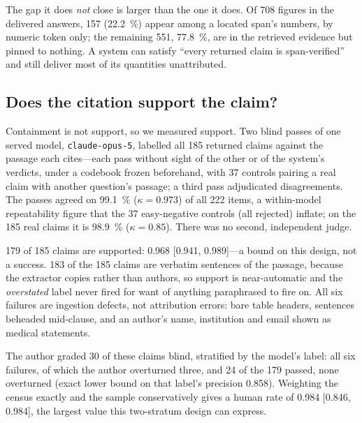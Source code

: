 \documentclass[conference,a4paper]{IEEEtran}
\begin{document}
The gap it does \emph{not} close is larger than the one it does. Of \num{708} figures in the
delivered answers, \num{157} (\SI{22.2}{\percent}) appear among a located span's numbers, by
numeric token only; the remaining \num{551}, \SI{77.8}{\percent}, are in the retrieved
evidence but pinned to nothing. A system can satisfy ``every returned claim is
span-verified'' and still deliver most of its quantities unattributed.

\subsection{Does the citation support the claim?}
Containment is not support, so we measured support. Two blind passes of one served model,
\texttt{claude-opus-5}, labelled all \num{185} returned claims against the passage each
cites---each pass without sight of the other or of the system's verdicts, under a codebook
frozen beforehand, with \num{37} controls pairing a real claim with another question's
passage; a third pass adjudicated disagreements. The passes agreed on \SI{99.1}{\percent}
($\kappa = \num{0.973}$) of all \num{222} items, a within-model repeatability figure that the
\num{37} easy-negative controls (all rejected) inflate; on the \num{185} real claims it is
\SI{98.9}{\percent} ($\kappa = \num{0.85}$). There was no second, independent judge.

\num{179} of \num{185} claims are supported: \num{0.968} [\num{0.941}, \num{0.989}]---a
bound on this design, not a success. \num{183} of the \num{185} claims are verbatim
sentences of the passage, because the extractor copies rather than authors, so support is
near-automatic and the \emph{overstated} label never fired for want of anything
paraphrased to fire on. All six failures are ingestion defects, not attribution errors: bare
table headers, sentences beheaded mid-clause, and an author's name, institution and email
shown as medical statements.

The author graded \num{30} of these claims blind, stratified by the model's label: all six
failures, of which the author overturned three, and \num{24} of the \num{179} passed, none
overturned (exact lower bound on that label's precision \num{0.858}). Weighting the census
exactly and the sample conservatively gives a human rate of \num{0.984} [\num{0.846},
\num{0.984}], the largest value this two-stratum design can express.
\end{document}
